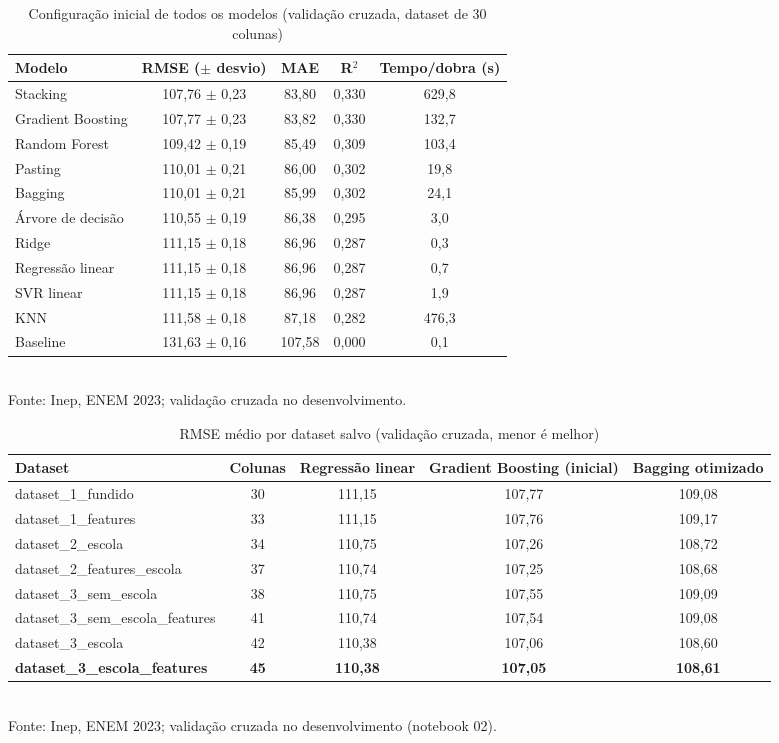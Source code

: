 \documentclass[conference,a4paper]{IEEEtran}
\begin{document}
\begin{table}[!t]
\caption{Configuração inicial de todos os modelos (validação cruzada, dataset de 30 colunas)}
\centering\footnotesize
\begin{tabularx}{\textwidth}{>{\raggedright\arraybackslash}Xcccc}
\toprule
\textbf{Modelo} & \textbf{RMSE ($\pm$ desvio)} & \textbf{MAE} & \textbf{R$^2$} & \textbf{Tempo/dobra (s)} \\
\midrule
Stacking & 107,76 $\pm$ 0,23 & 83,80 & 0,330 & 629,8 \\
Gradient Boosting & 107,77 $\pm$ 0,23 & 83,82 & 0,330 & 132,7 \\
Random Forest & 109,42 $\pm$ 0,19 & 85,49 & 0,309 & 103,4 \\
Pasting & 110,01 $\pm$ 0,21 & 86,00 & 0,302 & 19,8 \\
Bagging & 110,01 $\pm$ 0,21 & 85,99 & 0,302 & 24,1 \\
Árvore de decisão & 110,55 $\pm$ 0,19 & 86,38 & 0,295 & 3,0 \\
Ridge & 111,15 $\pm$ 0,18 & 86,96 & 0,287 & 0,3 \\
Regressão linear & 111,15 $\pm$ 0,18 & 86,96 & 0,287 & 0,7 \\
SVR linear & 111,15 $\pm$ 0,18 & 86,96 & 0,287 & 1,9 \\
KNN & 111,58 $\pm$ 0,18 & 87,18 & 0,282 & 476,3 \\
Baseline & 131,63 $\pm$ 0,16 & 107,58 & 0,000 & 0,1 \\
\bottomrule
\end{tabularx}
\\[2pt]{\scriptsize Fonte: Inep, ENEM 2023; validação cruzada no desenvolvimento.}
\end{table}

\begin{table}[!t]
\caption{RMSE médio por dataset salvo (validação cruzada, menor é melhor)}
\centering\footnotesize
\begin{tabularx}{\textwidth}{>{\raggedright\arraybackslash}Xcccc}
\toprule
\textbf{Dataset} & \textbf{Colunas} & \textbf{Regressão linear} & \textbf{Gradient Boosting (inicial)} & \textbf{Bagging otimizado} \\
\midrule
dataset\_1\_fundido & 30 & 111,15 & 107,77 & 109,08 \\
dataset\_1\_features & 33 & 111,15 & 107,76 & 109,17 \\
dataset\_2\_escola & 34 & 110,75 & 107,26 & 108,72 \\
dataset\_2\_features\_escola & 37 & 110,74 & 107,25 & 108,68 \\
dataset\_3\_sem\_escola & 38 & 110,75 & 107,55 & 109,09 \\
dataset\_3\_sem\_escola\_features & 41 & 110,74 & 107,54 & 109,08 \\
dataset\_3\_escola & 42 & 110,38 & 107,06 & 108,60 \\
\textbf{dataset\_3\_escola\_features} & \textbf{45} & \textbf{110,38} & \textbf{107,05} & \textbf{108,61} \\
\bottomrule
\end{tabularx}
\\[2pt]{\scriptsize Fonte: Inep, ENEM 2023; validação cruzada no desenvolvimento (notebook 02).}
\end{table}
\end{document}
